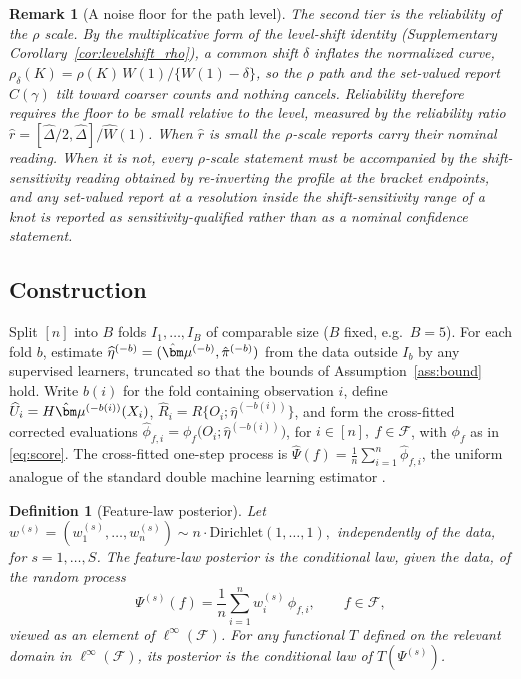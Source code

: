 \documentclass[11pt]{article}
\newtheorem{definition}{Definition}
\newtheorem{remark}{Remark}
\newcommand{\calF}{\mathcal F}
\newcommand{\bmu}{\bm\mu}
\newcommand{\hateta}{\widehat\eta}
\newcommand{\hU}{\widehat U}
\newcommand{\hR}{\widehat R}
\newcommand{\hPsi}{\widehat\Psi}
\newcommand{\hphi}{\widehat\phi}
\begin{document}
\begin{remark}[A noise floor for the path level]
The second tier is the reliability of the $\rho$ scale. By the multiplicative form of the level-shift identity (Supplementary Corollary~\ref{cor:levelshift_rho}), a common shift $\delta$ inflates the normalized curve, $\rho_\delta(K)=\rho(K)\,W(1)/\{W(1)-\delta\}$, so the $\rho$ path and the set-valued report $\widehat C(\gamma)$ tilt toward coarser counts and nothing cancels. Reliability therefore requires the floor to be small relative to the level, measured by the reliability ratio $\hat r=[\widehat\Delta/2,\widehat\Delta]/\widehat W(1)$. When $\hat r$ is small the $\rho$-scale reports carry their nominal reading. When it is not, every $\rho$-scale statement must be accompanied by the shift-sensitivity reading obtained by re-inverting the profile at the bracket endpoints, and any set-valued report at a resolution inside the shift-sensitivity range of a knot is reported as sensitivity-qualified rather than as a nominal confidence statement.
\end{remark}



\subsection{Construction}\label{sec:construction}

Split $[n]$ into $B$ folds $I_1,\dots,I_B$ of comparable size ($B$ fixed, e.g.\ $B=5$).  For each fold $b$, estimate $\hateta^{(-b)}=(\hat\bmu^{(-b)},\hat\pi^{(-b)})$ from the data outside $I_b$ by any supervised learners, truncated so that the bounds of Assumption~\ref{ass:bound} hold.  Write $b(i)$ for the fold containing observation $i$, define $\hU_i=H\hat\bmu^{(-b(i))}(X_i)$, $\hR_i=R\{O_i;\hateta^{(-b(i))}\}$,
and form the cross-fitted corrected evaluations $\hphi_{f,i}=\phi_f\bigl(O_i;\hateta^{(-b(i))}\bigr)$, for $i\in[n],\ f\in\calF$,
with $\phi_f$ as in \eqref{eq:score}.  The cross-fitted one-step process is $\hPsi(f)=\frac1n\sum_{i=1}^n \hphi_{f,i}$,
the uniform analogue of the standard double machine learning estimator \citep{chernozhukov2018}.

\begin{definition}[Feature-law posterior]\label{def:flposterior}
Let 
$w^{(s)}=(w^{(s)}_1,\dots,w^{(s)}_n)\sim n\cdot\mathrm{Dirichlet}(1,\dots,1),$ independently of the data, for $s=1,\dots,S$.  The feature-law posterior is the conditional law, given the data, of the random process
\begin{equation}\label{eq:posteriorprocess}
\Psi^{(s)}(f)
=
\frac1n\sum_{i=1}^n w^{(s)}_i\,\hphi_{f,i},
\qquad f\in\calF ,
\end{equation}
viewed as an element of $\ell^\infty(\calF)$.  For any functional $T$ defined on the relevant domain in $\ell^\infty(\calF)$, its posterior is the conditional law of $T(\Psi^{(s)})$.
\end{definition}
\end{document}
